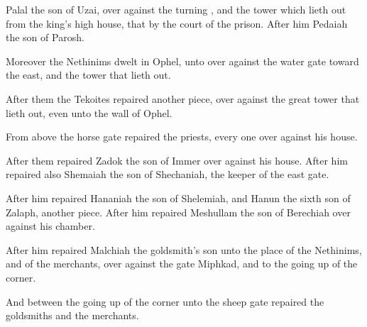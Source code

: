 {Palal the
son of
Uzai, over against the
turning
{}, and the
tower which lieth
out from the
king’s
high
house, that
{} by the
court of the
prison.
After him
Pedaiah the
son of
Parosh.

Moreover the
Nethinims
dwelt in
Ophel, unto
{} over against the
water
gate toward the
east, and the
tower that lieth
out.

After them the
Tekoites
repaired
another
piece, over against the
great
tower that lieth
out, even unto the
wall of
Ophel.

From above the
horse
gate
repaired the
priests, every
one over
against his
house.

After them
repaired
Zadok the
son of
Immer over against his
house.
After him
repaired also
Shemaiah the
son of
Shechaniah, the
keeper of the
east
gate.

After him
repaired
Hananiah the
son of
Shelemiah, and
Hanun the
sixth
son of
Zalaph,
another
piece.
After him
repaired
Meshullam the
son of
Berechiah over against his
chamber.

After him
repaired
Malchiah the
goldsmith’s
son unto the
place of the
Nethinims, and of the
merchants, over against the
gate
Miphkad, and to the going
up of the
corner.

And between the going
up of the
corner unto the
sheep
gate
repaired the
goldsmiths and the
merchants.




\par }
